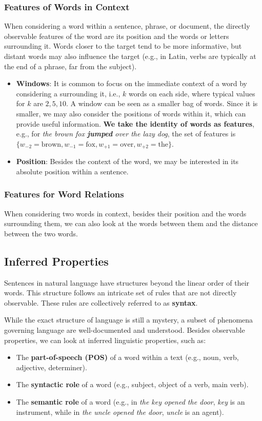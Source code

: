 \subsubsection{Features of Words in Context}
When considering a word within a sentence, phrase, or document, the directly observable features of the word are its position and the words or letters surrounding it. Words closer to the target tend to be more informative, but distant words may also influence the target (e.g., in Latin, verbs are typically at the end of a phrase, far from the subject).

\begin{itemize}
    \item \textbf{Windows}: It is common to focus on the immediate context of a word by considering a  surrounding it, i.e., $k$ words on each side, where typical values for $k$ are $2, 5, 10$. A window can be seen as a smaller bag of words. Since it is smaller, we may also consider the positions of words within it, which can provide useful information. \textbf{We take the identity of words as features}, e.g., for \textit{the brown fox \textbf{jumped} over the lazy dog}, the set of features is $\{w_{-2}=\text{brown}, w_{-1}=\text{fox}, w_{+1}=\text{over}, w_{+2}=\text{the}\}$.

    \item \textbf{Position}: Besides the context of the word, we may be interested in its absolute position within a sentence.
\end{itemize}

\subsubsection{Features for Word Relations}
When considering two words in context, besides their position and the words surrounding them, we can also look at the words between them and the distance between the two words.

\subsection{Inferred Properties}
Sentences in natural language have structures beyond the linear order of their words. This structure follows an intricate set of rules that are not directly observable. These rules are collectively referred to as \textbf{syntax}.

While the exact structure of language is still a mystery, a subset of phenomena governing language are well-documented and understood. Besides observable properties, we can look at inferred linguistic properties, such as:
\begin{itemize}
    \item The \textbf{part-of-speech (POS)} of a word within a text (e.g., noun, verb, adjective, determiner).
    \item The \textbf{syntactic role} of a word (e.g., subject, object of a verb, main verb).
    \item The \textbf{semantic role} of a word (e.g., in \textit{the key opened the door}, \textit{key} is an instrument, while in \textit{the uncle opened the door}, \textit{uncle} is an agent).
\end{itemize}

